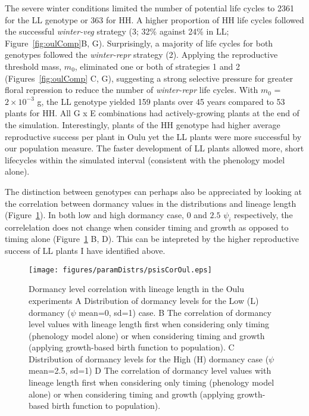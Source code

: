 The severe winter conditions limited the number of potential life cycles to 2361
for the LL genotype or 363 for HH. A higher proportion of HH life cycles
followed the successful \emph{winter-veg} strategy (3; 32\% against 24\% in LL;
Figure~\ref{fig:oulComp}B, G). Surprisingly, a majority of life cycles for both genotypes
followed the \emph{winter-repr} strategy (2).  Applying the reproductive
threshold mass, \(m_{0}\), eliminated one or both of strategies 1 and 2 (Figures~\ref{fig:oulComp}
C, G), suggesting a strong selective pressure for greater floral repression to
reduce the number of \emph{winter-repr} life cycles. With \(m_{0}\) =
\(2 \times 10^{- 3}\) g, the LL genotype yielded 159 plants over 45 years
compared to 53 plants for HH. All G x E combinations had actively-growing plants
at the end of the simulation. Interestingly, plants of the HH genotype had
higher average reproductive success per plant in Oulu yet the LL plants were
more successful by our population measure. The faster development of LL plants
allowed more, short lifecycles within the simulated interval (consistent with
the phenology model alone).

The distinction between genotypes can perhaps also be appreciated by looking at
the correlation between dormancy values in the distributions and lineage length
(Figure~\ref{fig:psisCorOul}). In both low and high dormancy case, $0$ and $2.5$
$\psi_i$ respectively, the correlelation does not change when consider timing
and growth as opposed to timing alone (Figure~\ref{fig:psisCorOul} B, D). This
can be intepreted by the higher reproductive success of LL plants I have
identified above.

\begin{figure}[tb]
  \centering
  \texttt{[image: figures/paramDistrs/psisCorOul.eps]}
  \caption{Dormancy level correlation with lineage length in the Oulu
    experiments A Distribution of dormancy levels for the Low (L) dormancy
    ($\psi$ mean=0, sd=1) case. B The correlation of dormancy level values with
    lineage length first when considering only timing (phenology model alone) or
    when considering timing and growth (applying growth-based birth function to
    population). C Distribution of dormancy levels for the High (H) dormancy
    case ($\psi$ mean=2.5, sd=1) D The correlation of dormancy level values with
    lineage length first when considering only timing (phenology model alone) or
    when considering timing and growth (applying growth-based birth function to
    population).}
  \label{fig:psisCorOul}
\end{figure}

